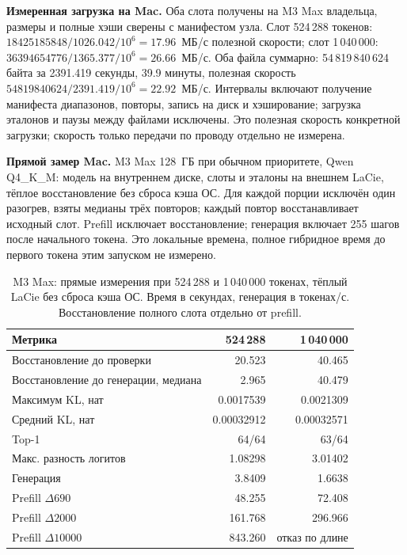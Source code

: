 \textbf{Измеренная загрузка на Mac.} Оба слота получены на M3 Max владельца,
размеры и полные хэши сверены с манифестом узла.
Слот 524\,288 токенов: $18425185848/1026.042/10^6=17.96$~МБ/с полезной скорости;
слот 1\,040\,000: $36394654776/1365.377/10^6=26.66$~МБ/с.
Оба файла суммарно: 54\,819\,840\,624 байта за 2391.419 секунды, 39.9 минуты,
полезная скорость $54819840624/2391.419/10^6=22.92$~МБ/с.
Интервалы включают получение манифеста диапазонов, повторы, запись на диск и хэширование;
загрузка эталонов и паузы между файлами исключены. Это полезная скорость конкретной загрузки;
скорость только передачи по проводу отдельно не измерена.

\textbf{Прямой замер Mac.} M3 Max 128~ГБ при обычном приоритете, Qwen Q4\_K\_M:
модель на внутреннем диске, слоты и эталоны на внешнем LaCie, тёплое восстановление без сброса кэша ОС.
Для каждой порции исключён один разогрев, взяты медианы трёх повторов; каждый повтор восстанавливает исходный слот.
Prefill исключает восстановление; генерация включает 255 шагов после начального токена.
Это локальные времена, полное гибридное время до первого токена этим запуском не измерено.

\begin{table}[t]
\centering
\caption{M3 Max: прямые измерения при 524\,288 и 1\,040\,000 токенах, тёплый LaCie без сброса кэша ОС.
Время в секундах, генерация в токенах/с. Восстановление полного слота отдельно от prefill.}
\label{tab:mac-direct-depth}
\footnotesize
\begin{tabular}{lrr}
\toprule
Метрика & 524\,288 & 1\,040\,000 \\
\midrule
Восстановление до проверки & 20.523 & 40.465 \\
Восстановление до генерации, медиана & 2.965 & 40.479 \\
Максимум KL, нат & 0.0017539 & 0.0021309 \\
Средний KL, нат & 0.00032912 & 0.00032571 \\
Top-1 & 64/64 & 63/64 \\
Макс. разность логитов & 1.08298 & 3.01402 \\
Генерация & 3.8409 & 1.6638 \\
Prefill $\Delta690$ & 48.255 & 72.408 \\
Prefill $\Delta2000$ & 161.768 & 296.966 \\
Prefill $\Delta10000$ & 843.260 & отказ по длине \\
\bottomrule
\end{tabular}
\end{table}

